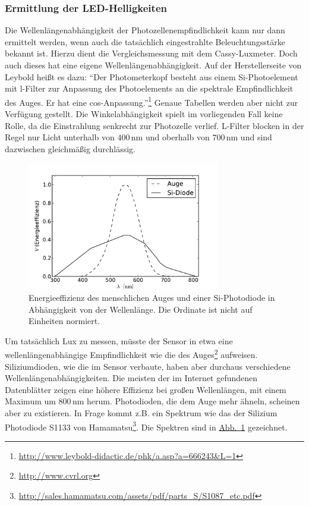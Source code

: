 \documentclass[11pt]{scrartcl}
\newcommand{\unit}[1]{\ensuremath{\,\mathrm{#1}}} %
\begin{document}
\subsubsection{Ermittlung der LED-Helligkeiten}
Die Wellenlängenabhängigkeit der Photozellenempfindlichkeit kann nur dann ermittelt werden, wenn auch die tatsächlich eingestrahlte Beleuchtungsstärke bekannt ist. Hierzu dient die Vergleichsmessung mit dem Cassy-Luxmeter. Doch auch dieses hat eine eigene Wellenlängenabhängigkeit. Auf der Herstellerseite von Leybold heißt es dazu: "`Der Photometerkopf besteht aus einem Si-Photoelement mit l-Filter zur Anpassung des Photoelements an die spektrale Empfindlichkeit des Auges. Er hat eine cos-Anpassung."'\footnote{\url{http://www.leybold-didactic.de/phk/a.asp?a=666243&L=1}} Genaue Tabellen werden aber nicht zur Verfügung gestellt. Die Winkelabhängigkeit spielt im vorliegenden Fall keine Rolle, da die Einstrahlung senkrecht zur Photozelle verlief. L-Filter blocken in der Regel nur Licht unterhalb von $400\unit{nm}$ und oberhalb von $700\unit{nm}$ und sind dazwischen gleichmäßig durchlässig.
\begin{figure}[ht]
\begin{center}
\includegraphics[width=0.75\textwidth]{images/lichteffizienz_silizium_auge.pdf}
\end{center}
\vspace{-1.5\baselineskip}
\caption{Energieeffizienz des menschlichen Auges und einer Si-Photodiode in Abhängigkeit von der Wellenlänge. Die Ordinate ist nicht auf Einheiten normiert.}
\label{lichteffizienz_auge}
\end{figure}
Um tatsächlich Lux zu messen, müsste der Sensor in etwa eine wellenlängenabhängige Empfindlichkeit wie die des Auges\footnote{\url{http://www.cvrl.org}} aufweisen. Siliziumdioden, wie die im Sensor verbaute, haben aber durchaus verschiedene Wellenlängenabhängigkeiten. Die meisten der im Internet gefundenen Datenblätter zeigen eine höhere Effizienz bei großen Wellenlängen, mit einem Maximum um $800\unit{nm}$ herum. Photodioden, die dem Auge mehr ähneln, scheinen aber zu existieren. In Frage kommt z.B. ein Spektrum wie das der Silizium Photodiode S1133 von Hamamatsu\footnote{\url{http://sales.hamamatsu.com/assets/pdf/parts_S/S1087_etc.pdf}}. Die Spektren sind in \hyperref[lichteffizienz_auge]{Abb.~\ref{lichteffizienz_auge}} gezeichnet.
\end{document}
